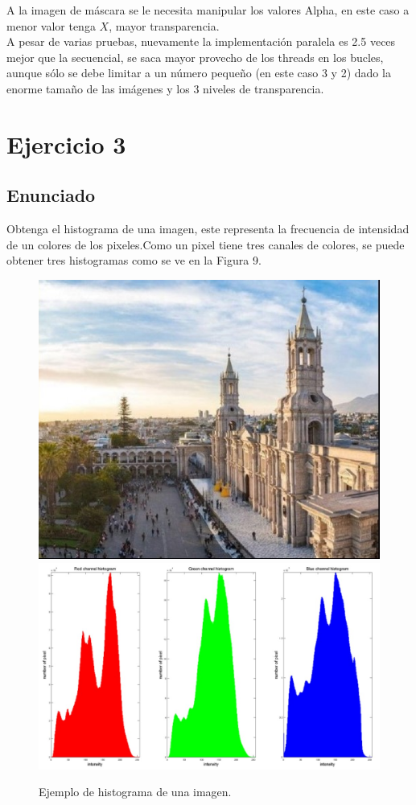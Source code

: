 \documentclass[https://www.overleaf.com/project/63761df255a8a9f4a15c3579
	letterpaper, %
	10pt, %
]{CSUniSchoolLabReport}
\begin{document}
A la imagen de máscara se le necesita manipular los valores Alpha, en este caso a menor valor tenga \(X\), mayor transparencia.
\\
A pesar de varias pruebas, nuevamente la implementación paralela es 2.5 veces mejor que la secuencial, se saca mayor provecho de los threads en los bucles, aunque sólo se debe limitar a un número pequeño (en este caso 3 y 2) dado la enorme tamaño de las imágenes y los 3 niveles de transparencia. 

\section*{Ejercicio  3 }

\subsection*{Enunciado}
Obtenga el histograma de una imagen, este representa la frecuencia de intensidad de un colores de los pixeles.Como un pixel tiene tres canales de colores, se puede obtener tres histogramas como se ve en la Figura 9.

\begin{figure}[H]
    \centering 
    \includegraphics[width=.4\textwidth]{images/10.jpg}
    \includegraphics[width=.55\textwidth]{images/13.jpg}
    \caption{Ejemplo de histograma de una imagen.}
    \label{fig}
\end{figure}
\end{document}
